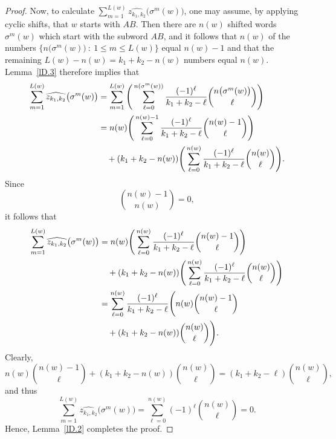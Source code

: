 \documentclass[reqno,10pt,centertags]{amsart}
\newcommand{\no}{\notag}
\let\leq\leqslant
\numberwithin{equation}{section}
\theoremstyle{remark}
\begin{document}
\begin{proof}
Now, to calculate $\sum_{m=1}^{L(w)}\widehat{z_{k_1,k_2}}\bigl(\sigma^m(w)\bigr)$, 
one may assume, by applying cyclic shifts, that $w$ starts with $AB$. 
Then there are $n(w)$ shifted words $\sigma^m(w)$ which start with the subword $AB$, 
and it follows that $n(w)$ of the numbers $\{n\bigl(\sigma^m(w)\bigr)\::\: 1\leq m\leq L(w)\}$ equal $n(w)-1$ 
and that the remaining $L(w)-n(w) = k_1+k_2-n(w)$ numbers equal $n(w)$. 
Lemma~\ref{lD.3} therefore implies that 
\begin{align} 
  \sum_{m=1}^{L(w)}\widehat{z_{k_1,k_2}}\bigl(\sigma^m(w)\bigr)
&=\sum_{m=1}^{L(w)}\Bigg(\sum_{\ell=0}^{n(\sigma^m(w))}\frac{(-1)^{\ell}}{k_1+k_2-\ell}\binom{n\bigl(\sigma^m(w)\bigr)}{\ell}\Bigg)   \no \\
&=n(w) \Bigg(\sum_{\ell=0}^{n(w)-1}\frac{(-1)^{\ell}}{k_1+k_2-\ell}\binom{n(w)-1}{\ell}\Bigg)   \no \\
& \quad +(k_1+k_2-n(w)) \Bigg(\sum_{\ell=0}^{n(w)}\frac{(-1)^{\ell}}{k_1+k_2-\ell}\binom{n(w)}{\ell}\Bigg).
\end{align} 
Since
\begin{equation} 
\binom{n(w)-1}{n(w)}=0,
\end{equation} 
it follows that
\begin{align} 
\sum_{m=1}^{L(w)}\widehat{z_{k_1,k_2}}\bigl(\sigma^m(w)\bigr)
&=n(w) \Bigg(\sum_{\ell=0}^{n(w)}\frac{(-1)^{\ell}}{k_1+k_2-\ell}\binom{n(w)-1}{\ell}\Bigg)    \no \\
& \quad +(k_1+k_2-n(w)) \Bigg(\sum_{\ell=0}^{n(w)}\frac{(-1)^{\ell}}{k_1+k_2-\ell}\binom{n(w)}{\ell}\Bigg)   \no \\
&=\sum_{\ell=0}^{n(w)}\frac{(-1)^{\ell}}{k_1+k_2-\ell} \Bigg(n(w)\binom{n(w)-1}{\ell}    \no \\ 
& \quad +(k_1+k_2-n(w))\binom{n(w)}{\ell}\Bigg).\end{align} 
Clearly,
\begin{equation} 
n(w)\binom{n(w)-1}{\ell}+(k_1+k_2-n(w))\binom{n(w)}{\ell}=(k_1+k_2-\ell)\binom{n(w)}{\ell}, 
\end{equation} 
and thus 
\begin{equation} 
\sum_{m=1}^{L(w)}\widehat{z_{k_1,k_2}}\bigl(\sigma^m(w)\bigr)=\sum_{\ell=0}^{n(w)}(-1)^{\ell}\binom{n(w)}{\ell}=0.  
\end{equation} 
Hence, Lemma~\ref{lD.2} completes the proof. 
\end{proof}
\end{document}
